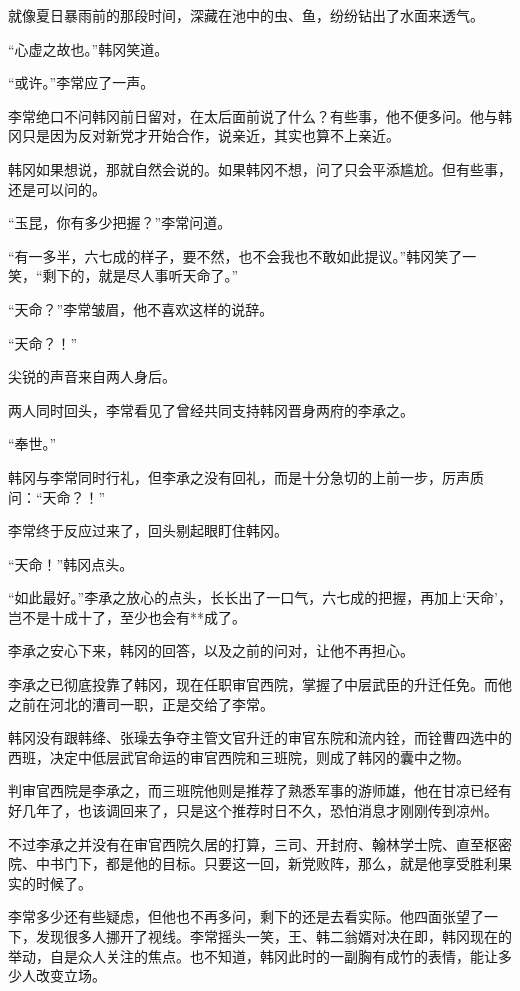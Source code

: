 就像夏日暴雨前的那段时间，深藏在池中的虫、鱼，纷纷钻出了水面来透气。

“心虚之故也。”韩冈笑道。

“或许。”李常应了一声。

李常绝口不问韩冈前日留对，在太后面前说了什么？有些事，他不便多问。他与韩冈只是因为反对新党才开始合作，说亲近，其实也算不上亲近。

韩冈如果想说，那就自然会说的。如果韩冈不想，问了只会平添尴尬。但有些事，还是可以问的。

“玉昆，你有多少把握？”李常问道。

“有一多半，六七成的样子，要不然，也不会我也不敢如此提议。”韩冈笑了一笑，“剩下的，就是尽人事听天命了。”

“天命？”李常皱眉，他不喜欢这样的说辞。

“天命？！”

尖锐的声音来自两人身后。

两人同时回头，李常看见了曾经共同支持韩冈晋身两府的李承之。

“奉世。”

韩冈与李常同时行礼，但李承之没有回礼，而是十分急切的上前一步，厉声质问：“天命？！”

李常终于反应过来了，回头剔起眼盯住韩冈。

“天命！”韩冈点头。

“如此最好。”李承之放心的点头，长长出了一口气，六七成的把握，再加上‘天命’，岂不是十成十了，至少也会有**成了。

李承之安心下来，韩冈的回答，以及之前的问对，让他不再担心。

李承之已彻底投靠了韩冈，现在任职审官西院，掌握了中层武臣的升迁任免。而他之前在河北的漕司一职，正是交给了李常。

韩冈没有跟韩绛、张璪去争夺主管文官升迁的审官东院和流内铨，而铨曹四选中的西班，决定中低层武官命运的审官西院和三班院，则成了韩冈的囊中之物。

判审官西院是李承之，而三班院他则是推荐了熟悉军事的游师雄，他在甘凉已经有好几年了，也该调回来了，只是这个推荐时日不久，恐怕消息才刚刚传到凉州。

不过李承之并没有在审官西院久居的打算，三司、开封府、翰林学士院、直至枢密院、中书门下，都是他的目标。只要这一回，新党败阵，那么，就是他享受胜利果实的时候了。

李常多少还有些疑虑，但他也不再多问，剩下的还是去看实际。他四面张望了一下，发现很多人挪开了视线。李常摇头一笑，王、韩二翁婿对决在即，韩冈现在的举动，自是众人关注的焦点。也不知道，韩冈此时的一副胸有成竹的表情，能让多少人改变立场。

